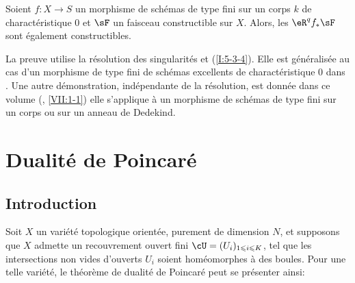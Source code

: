 \begin{theorem}\label{I:5-3-7} %
Soient $f:X\to S$ un morphisme de schémas de type fini sur un corps $k$ de 
charactéristique $0$ et $\sF$ un faisceau constructible sur $X$. Alors, les 
$\eR^q f_* \sF$ sont également constructibles.
\end{theorem}

La preuve utilise la résolution des singularités et (\ref{I:5-3-4}). Elle est 
généralisée au cas d'un morphisme de type fini de schémas excellents de 
charactéristique $0$ dans \cite[XIX.5]{sga4}. Une autre démonstration, 
indépendante de la résolution, est donnée dans ce volume 
(, \ref{VII:1-1}) 
elle s'applique à un morphisme de schémas de type fini sur un corps ou sur 
un anneau de Dedekind. 




















\section{Dualité de Poincaré}










\subsection{Introduction}\label{I:6-1}

Soit $X$ un variété topologique orientée, purement de dimension $N$, et 
supposons que $X$ admette un recouvrement ouvert fini 
$\cU=(U_i)_{1\leqslant i\leqslant K}$, tel que les intersections non vides 
d'ouverts $U_i$ soient homéomorphes à des boules. Pour une telle variété, 
le théorème de dualité de Poincaré peut se présenter ainsi: 

